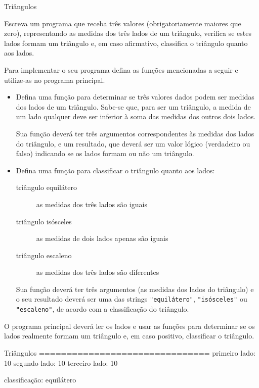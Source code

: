 \documentclass[11pt]{practice}
\begin{document}
\begin{task}[breakable]{Triângulos}{}

  Escreva um programa que receba três valores (obrigatoriamente maiores que
  zero), representando as medidas dos três lados de um triângulo,
  verifica se estes lados formam um triângulo e, em caso afirmativo,
  classifica o triângulo quanto aos lados.

  Para implementar o seu programa defina as funções mencionadas a seguir
  e utilize-as no programa principal.

  \begin{itemize}
    \item Defina uma função para determinar se três valores dados podem
    ser medidas dos lados de um triângulo. Sabe-se que, para ser um
    triângulo, a medida de um lado qualquer deve ser inferior à soma das
    medidas dos outros dois lados.

    Sua função deverá ter três argumentos correspondentes às medidas dos
    lados do triângulo, e um resultado, que deverá ser um valor lógico
    (verdadeiro ou falso) indicando se os lados formam ou não um
    triângulo.

    \item Defina uma função para classificar o triângulo quanto aos
    lados:
    \begin{description}
      \item[triângulo equilátero] as medidas dos três lados são iguais
      \item[triângulo isósceles] as medidas de dois lados apenas são
      iguais
      \item[triângulo escaleno] as medidas dos três lados são diferentes
    \end{description}
    Sua função deverá ter três argumentos (as medidas dos lados do
    triângulo) e o seu resultado deverá ser uma das strings
    \texttt{"equilátero"}, \texttt{"isósceles"} ou \texttt{"escaleno"},
    de acordo com a classificação do triângulo.
  \end{itemize}

  O programa principal deverá ler os lados e usar as funções para
  determinar se os lados realmente formam um triângulo e, em caso
  positivo, classificar o triângulo.

  \begin{runexample}
Triângulos
===============================
primeiro lado: 10
segundo lado: 10
terceiro lado: 10

classificação: equilátero
  \end{runexample}


\end{task}
\end{document}
